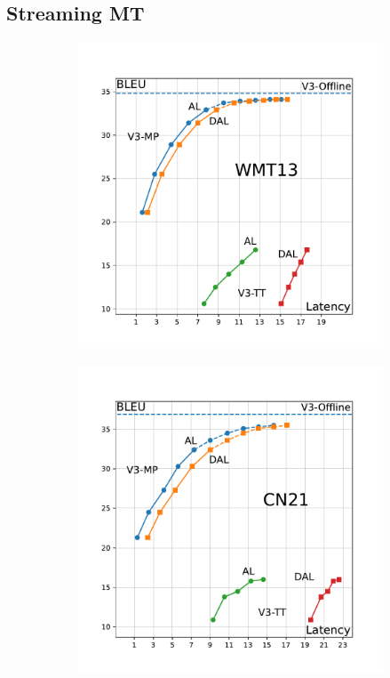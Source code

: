 \documentclass[landscape]{article}
\begin{document}
\subsection*{Streaming MT}
\vspace{-7.5mm}
\begin{figure}[htp]
\begin{subfigure}{.5\textwidth}
\centering
\includegraphics[trim=1cm 1cm 1cm 1.5cm, scale=0.85, clip]{figures/bleu-latency-wmt13}
\end{subfigure}
\begin{subfigure}{.5\textwidth}
\centering
\includegraphics[trim=1cm 1cm 1cm 1.5cm, scale=0.85, clip]{figures/bleu-latency-cn21}
\end{subfigure}
\end{figure}
\end{document}
